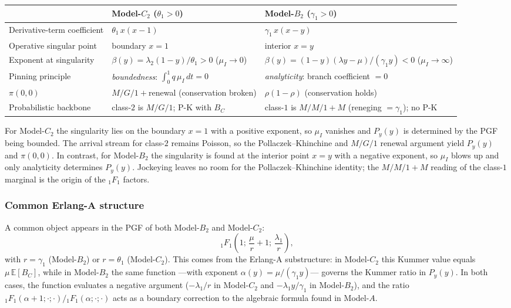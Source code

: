 \begin{center}
    \renewcommand{\arraystretch}{1.45}
    \begin{tabular}{p{} p{} p{}}
        \hline
         & \textbf{Model-$C_2$ ($\theta_1>0$)} & \textbf{Model-$B_2$ ($\gamma_1>0$)} \\
        \hline
        Derivative-term coefficient
         & $\theta_1\,x(x-1)$
         & $\gamma_1\,x(x-y)$ \\
        Operative singular point
         & boundary $x=1$
         & interior $x=y$ \\
        Exponent at singularity
         & $\beta(y)=\lambda_2(1-y)/\theta_1>0$ \;($\mu_I\to0$)
         & $\beta(y)=(1-y)(\lambda y-\mu)/(\gamma_1 y)<0$ \;($\mu_I\to\infty$) \\
        Pinning principle
         & \emph{boundedness}: $\int_0^1 q\,\mu_I\,dt=0$
         & \emph{analyticity}: branch coefficient $=0$ \\
        $\pi(0,0)$
         & $M/G/1{+}$renewal (conservation broken)
         & $\rho(1-\rho)$ (conservation holds) \\
        Probabilistic backbone
         & class-$2$ is $M/G/1$; P-K with $B_C$
         & class-$1$ is $M/M/1{+}M$ (reneging $=\gamma_1$); no P-K \\
        \hline
    \end{tabular}
\end{center}

For Model-$C_2$ the singularity lies on the boundary $x=1$ with a positive
exponent, so $\mu_I$ vanishes and $P_y(y)$ is determined by the PGF being bounded. The arrival stream for class-$2$ remains Poisson, so the Pollaczek--Khinchine and $M/G/1$ renewal argument yield $P_y(y)$ and $\pi(0,0)$. In contrast, for Model-$B_2$ the singularity is found at the interior point $x=y$ with a negative exponent, so $\mu_I$ blows up and only analyticity determines $P_y(y)$. Jockeying leaves no room for the Pollaczek--Khinchine identity; the $M/M/1{+}M$ reading of the class-$1$ marginal is the origin of the ${}_1F_1$ factors.

\subsubsection*{Common Erlang-A structure}

A common object appears in the PGF of both Model-$B_2$ and Model-$C_2$:
\begin{equation}
    {}_1F_1\!\left(1;\,\frac{\mu}{r}+1;\,\frac{\lambda_1}{r}\right),
    \label{eq:comp:1F1}
\end{equation}
with $r=\gamma_1$ (Model-$B_2$) or $r=\theta_1$ (Model-$C_2$).
This comes from the Erlang-A substructure: in Model-$C_2$ this Kummer value equals $\mu\,\mathbb{E}[B_C]$, while in
Model-$B_2$ the same function ---with exponent $\alpha(y)=\mu/(\gamma_1 y)$--- governs the Kummer ratio in $P_y(y)$. In both cases, the function evaluates a negative argument ($-\lambda_1/r$ in Model-$C_2$ and $-\lambda_1 y/\gamma_1$ in Model-$B_2$), and the ratio ${}_1F_1(\alpha+1;\cdot;\cdot)/{}_1F_1(\alpha;\cdot;\cdot)$ acts as a boundary correction to the algebraic formula found in Model-$A$.

